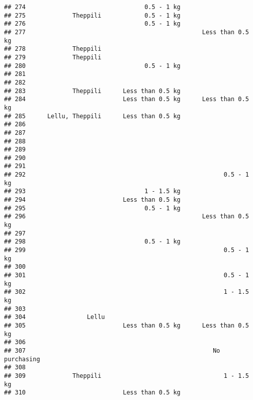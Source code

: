 \documentclass[
]{article}
\begin{document}
\begin{verbatim}
## 274                                 0.5 - 1 kg                      
## 275             Theppili            0.5 - 1 kg                      
## 276                                 0.5 - 1 kg                      
## 277                                                 Less than 0.5 kg
## 278             Theppili                                            
## 279             Theppili                                            
## 280                                 0.5 - 1 kg                      
## 281                                                                 
## 282                                                                 
## 283             Theppili      Less than 0.5 kg                      
## 284                           Less than 0.5 kg      Less than 0.5 kg
## 285      Lellu, Theppili      Less than 0.5 kg                      
## 286                                                                 
## 287                                                                 
## 288                                                                 
## 289                                                                 
## 290                                                                 
## 291                                                                 
## 292                                                       0.5 - 1 kg
## 293                                 1 - 1.5 kg                      
## 294                           Less than 0.5 kg                      
## 295                                 0.5 - 1 kg                      
## 296                                                 Less than 0.5 kg
## 297                                                                 
## 298                                 0.5 - 1 kg                      
## 299                                                       0.5 - 1 kg
## 300                                                                 
## 301                                                       0.5 - 1 kg
## 302                                                       1 - 1.5 kg
## 303                                                                 
## 304                 Lellu                                           
## 305                           Less than 0.5 kg      Less than 0.5 kg
## 306                                                                 
## 307                                                    No purchasing
## 308                                                                 
## 309             Theppili                                  1 - 1.5 kg
## 310                           Less than 0.5 kg                      

\end{verbatim}
\end{document}
